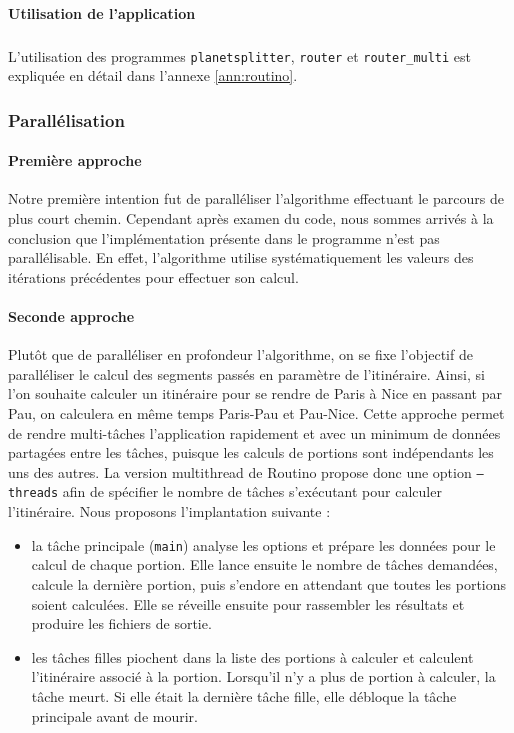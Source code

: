 \paragraph{Utilisation de l'application}
\subparagraph{}

L'utilisation des programmes \texttt{planetsplitter}, \texttt{router} et 
\texttt{router\_multi} est expliquée en détail dans l'annexe \ref{ann:routino}.

\subsubsection{Parallélisation}
\paragraph{Première approche}
Notre première intention fut de paralléliser l'algorithme effectuant le parcours
de plus court chemin. Cependant après examen du code, nous sommes arrivés 
à la conclusion que l'implémentation présente dans le programme n'est pas 
parallélisable. En effet, l'algorithme utilise systématiquement les valeurs 
des itérations précédentes pour effectuer son calcul.\\

\paragraph{Seconde approche}
Plutôt que de paralléliser en profondeur l'algorithme, on se fixe l'objectif de
paralléliser le calcul des segments passés en paramètre de l'itinéraire. Ainsi,
si l'on souhaite calculer un itinéraire pour se rendre de Paris à Nice en
passant par Pau, on calculera en même temps Paris-Pau et Pau-Nice. Cette
approche permet de rendre multi-tâches l'application rapidement et avec un
minimum de données partagées entre les tâches, puisque les calculs de portions
sont indépendants les uns des autres. La version multithread de Routino propose
donc une option \texttt{--threads} afin de spécifier le nombre de tâches 
s'exécutant pour calculer l'itinéraire. Nous proposons l'implantation suivante :
\begin{itemize}
\renewcommand{\labelitemi}{$\bullet$}
\item la tâche principale (\texttt{main}) analyse les options et prépare les
  données pour le calcul de chaque portion. Elle lance ensuite le nombre de
  tâches demandées, calcule la dernière portion, puis s'endore en attendant que
  toutes les portions soient calculées. Elle se réveille ensuite pour rassembler
  les résultats et produire les fichiers de sortie.
\item les tâches filles piochent dans la liste des portions à calculer et
  calculent l'itinéraire associé à la portion. Lorsqu'il n'y a plus de portion
  à calculer, la tâche meurt. Si elle était la dernière tâche fille, elle
  débloque la tâche principale avant de mourir.
\end{itemize}
